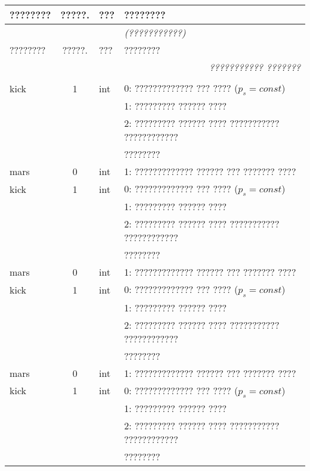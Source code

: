 \begin{longtable*}[c]{|l|c|l|l|} %
    \hline
    ???????? & ?????. & ??? & ????????               \\ \hline
    \endfirsthead   \hline
            \\ \hline
    ???????? & ?????. & ??? & ????????               \\ \hline
    \endhead        \hline
      \\ \hline
    \endfoot        \hline
    \endlastfoot
            \\ \hline
    kick & 1 & int & 0: ????????????? ??? ???? (\(p_s = const\)) \\
    &   &     & 1: ????????? ?????? ????                  \\
    &   &     & 2: ????????? ?????? ???? ??????????? ???????????? \\
    & & & ????????    \\
    mars & 0 & int & 1: ????????????? ?????? ??? ??????? ????     \\
    kick & 1 & int & 0: ????????????? ??? ???? (\(p_s = const\)) \\
    &   &     & 1: ????????? ?????? ????                  \\
    &   &     & 2: ????????? ?????? ???? ??????????? ???????????? \\
    & & & ????????    \\
    mars & 0 & int & 1: ????????????? ?????? ??? ??????? ????     \\
    kick & 1 & int & 0: ????????????? ??? ???? (\(p_s = const\)) \\
    &   &     & 1: ????????? ?????? ????                  \\
    &   &     & 2: ????????? ?????? ???? ??????????? ???????????? \\
    & & & ????????    \\
    mars & 0 & int & 1: ????????????? ?????? ??? ??????? ????     \\
    kick & 1 & int & 0: ????????????? ??? ???? (\(p_s = const\)) \\
    &   &     & 1: ????????? ?????? ????                  \\
    &   &     & 2: ????????? ?????? ???? ??????????? ???????????? \\
    & & & ????????    \\

\end{longtable*}
